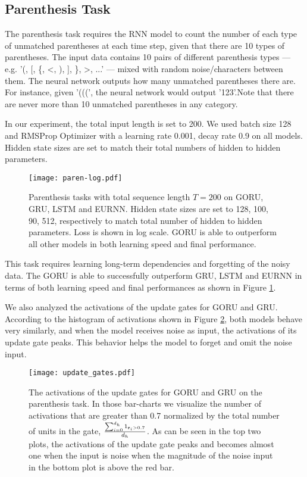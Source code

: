 \documentclass[letterpaper]{article} \usepackage{aaai18}  \usepackage{times}  \usepackage{helvet}  \usepackage{courier}  \usepackage{url}  \usepackage{graphicx}
\def\r{{\bf r}}
\begin{document}
\subsection{Parenthesis Task}

The parenthesis task\cite{foerster2016intelligible} requires the RNN model to count the number of each type of unmatched parentheses at each time step, given that there are 10 types of parentheses. The input data contains 10 pairs of different parenthesis types --- e.g. '(, [, \{, <, ), ], \}, >, ...' --- mixed with random noise/characters between them. The neural network outputs how many unmatched parentheses there are. For instance, given '(((', the neural network would output '123'.Note that there are never more than 10 unmatched parentheses in any category. 

In our experiment, the total input length is set to 200. We used batch size 128 and RMSProp Optimizer with a learning rate 0.001, decay rate 0.9 on all models. Hidden state sizes are set to match their total numbers of hidden to hidden parameters.


\begin{figure}[h!]
\centering
\texttt{[image: paren-log.pdf]}
\caption{Parenthesis tasks with total sequence length $T=200$ on GORU, GRU, LSTM and EURNN. Hidden state sizes are set to 128, 100, 90, 512, respectively to match total number of hidden to hidden parameters. Loss is shown in log scale. GORU is able to outperform all other models in both learning speed and final performance.}
\label{fig:paren}
\end{figure}

This task requires learning long-term dependencies and forgetting of the noisy data.
The GORU is able to successfully outperform GRU, LSTM and EURNN in terms of both learning speed and final performances as shown in Figure \ref{fig:paren}.

We also analyzed the activations of the update gates for GORU and GRU. According to the histogram of activations shown in Figure \ref{fig:bar}, both models behave very similarly, and when the model receives noise as input, the activations of its update gate peaks. This behavior helps the model to forget and omit the noise input.

\begin{figure}[h!]
\centering
\texttt{[image: update\_gates.pdf]}
\caption{The activations of the update gates for GORU and GRU on the parenthesis task. In those bar-charts we visualize the number of activations that are greater than 0.7 normalized by the total number of units in the gate, 
$\frac{\sum_{i=0}^{d_h}{1}_{\r_i > 0.7}}{d_h}$. 
As can be seen in the top two plots, the activations of the update gate peaks and becomes almost one when the input is noise when the magnitude of the noise input in the bottom plot is above the red bar.}
\label{fig:bar}
\end{figure}
\end{document}
